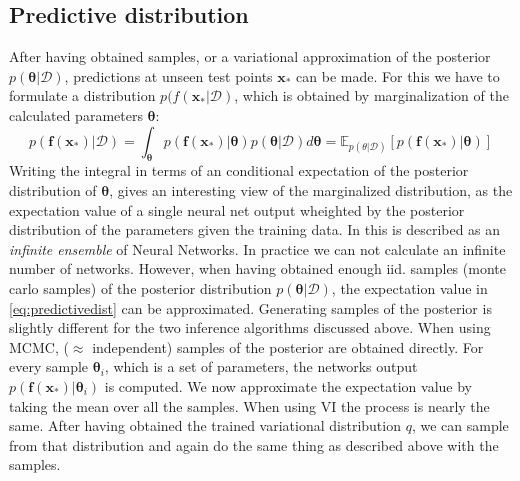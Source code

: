 \documentclass{article}
\begin{document}
\subsection{Predictive distribution}
After having obtained samples, or a variational approximation of the posterior $p(\bm \theta|\mathcal{D})$, predictions at unseen test points $\bm x_*$ can be made. For this we have to formulate a distribution $p(f(\bm x_*|\mathcal{D})$, which is obtained by marginalization of the calculated parameters $\bm \theta$:
\begin{equation}\label{eq:predictivedist}
    p(\bm f( \bm x_*) |\mathcal{D}) = \int_{\bm \theta} p(\bm f ({\bm x_*})|\bm \theta ) p(\bm \theta | \mathcal{D})d \bm \theta = \mathbb{E}_{p(\theta|\mathcal{D})} \left[ p(\bm f ({\bm x_*})|\bm \theta )\right]
\end{equation}
Writing the integral in terms of an conditional expectation of the posterior distribution of $\bm \theta$, gives an interesting view of the marginalized distribution, as the expectation value of a single neural net output wheighted by the posterior distribution of the parameters given the training data. In \cite{blundell2015weightuncertaintyneuralnetworks} this is described as an \textit{infinite ensemble} of Neural Networks. In practice we can not calculate an infinite number of networks. However, when having obtained enough iid. samples (monte carlo samples) of the posterior distribution $p(\bm \theta|\mathcal{D})$, the expectation value in \eqref{eq:predictivedist} can be approximated. Generating samples of the posterior is slightly different for the two inference algorithms discussed above. When using MCMC, ($\approx$ independent) samples of the posterior are obtained directly. For every sample $\bm \theta_i$, which is a set of parameters, the networks output $p(\bm f(\bm x_*)|\bm \theta_i)$ is computed. We now approximate the expectation value by taking the mean over all the samples. When using VI the process is nearly the same. After having obtained the trained variational distribution $q$, we can sample from that distribution and again do the same thing as described above with the samples. 
\end{document}
